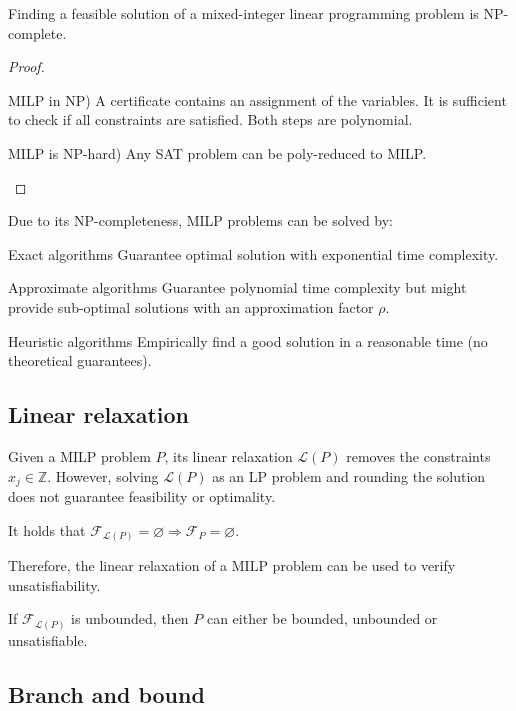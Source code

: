 \begin{theorem}
    Finding a feasible solution of a mixed-integer linear programming problem is NP-complete.

    \begin{proof}
        \phantom{}
        \begin{descriptionlist}
            \item[MILP in NP)] 
                A certificate contains an assignment of the variables. It is sufficient to check if all constraints are satisfied.
                Both steps are polynomial.
            \item[MILP is NP-hard)] 
                Any SAT problem can be poly-reduced to MILP.
        \end{descriptionlist}
    \end{proof}
\end{theorem}

\begin{remark}
    Due to its NP-completeness, MILP problems can be solved by:
    \begin{descriptionlist}
        \item[Exact algorithms] Guarantee optimal solution with exponential time complexity.
        \item[Approximate algorithms] Guarantee polynomial time complexity but might provide sub-optimal solutions with an approximation factor $\rho$.
        \item[Heuristic algorithms] Empirically find a good solution in a reasonable time (no theoretical guarantees).
    \end{descriptionlist}
\end{remark}


\subsection{Linear relaxation}

Given a MILP problem $P$, its linear relaxation $\mathcal{L}(P)$ removes the constraints $x_j \in \mathbb{Z}$.
However, solving $\mathcal{L}(P)$ as an LP problem and rounding the solution does not guarantee feasibility or optimality.

\begin{theorem}
    It holds that $\mathcal{F}_{\mathcal{L}(P)} = \varnothing \Rightarrow \mathcal{F}_P = \varnothing$.

    Therefore, the linear relaxation of a MILP problem can be used to verify unsatisfiability.
\end{theorem}

\begin{remark}
    If $\mathcal{F}_{\mathcal{L}(P)}$ is unbounded, then $P$ can either be bounded, unbounded or unsatisfiable.
\end{remark}



\subsection{Branch and bound}